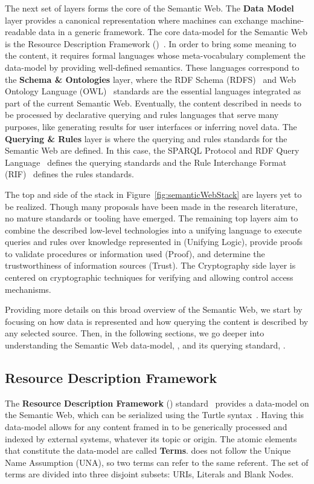 The next set of layers forms the core of the Semantic Web. The \textbf{Data Model} layer 
provides a canonical representation where machines can exchange machine-readable data in 
a generic framework. The core data-model for the Semantic Web is the Resource Description 
Framework (\RDF{})~\cite{key:rdfprimer}. In order to bring some meaning to the \RDF{} content, 
it requires formal languages whose meta-vocabulary complement the \RDF{} data-model by providing 
well-defined semantics. These languages correspond to the \textbf{Schema \& Ontologies} layer, 
where the RDF Schema (RDFS)~\cite{key:oldrdf} and Web Ontology Language (OWL)~\cite{key:owloverview, key:owl2rationale} 
standards are the essential languages integrated as part of the current Semantic Web. 
Eventually, the content described in \RDF{} needs to be processed by declarative querying 
and rules languages that serve many purposes, like generating results for user interfaces 
or inferring novel \RDF{} data. The \textbf{Querying \& Rules} layer is where the querying 
and rules standards for the Semantic Web are defined. In this case, the SPARQL Protocol 
and RDF Query Language~\cite{key:sparql,key:sparql11protocol,key:sparql11} 
defines the querying standards and the Rule Interchange Format (RIF)~\cite{key:rifframework} 
defines the rules standards.

The top and side of the stack in Figure~\ref{fig:semanticWebStack} are layers yet to be realized. Though many 
proposals have been made in the research literature, no mature standards or tooling have 
emerged. The remaining top layers aim to combine the described low-level technologies into 
a unifying language to execute queries and rules over knowledge represented in \RDF{} 
(Unifying Logic), provide proofs to validate procedures or information used (Proof), and 
determine the trustworthiness of information sources (Trust). The Cryptography side layer 
is centered on cryptographic techniques for verifying and allowing control access mechanisms.

Providing more details on this broad overview of the Semantic Web, we start by focusing on 
how data is represented and how querying the content is described by any selected source. 
Then, in the following sections, we go deeper into understanding the Semantic Web data-model, 
\RDF{}, and its querying standard, \SPARQL{}.

\subsection{Resource Description Framework}
\label{cap2:semWeb/rdf}
The \textbf{Resource Description Framework} (\RDF{}) standard~\cite{key:rdfprimer} provides 
a data-model on the Semantic Web, which can be serialized using the Turtle syntax~\cite{key:turtle}. 
Having this data-model allows for any content framed in \RDF{} to be generically processed 
and indexed by external systems, whatever its topic or origin. The atomic elements that 
constitute the \RDF{} data-model are called \textbf{\RDF{} Terms}. \RDF{} does not follow the Unique 
Name Assumption (UNA), so two \RDF{} terms can refer to the same referent. The set of \RDF{} terms 
are divided into three disjoint subsets: URIs, Literals and Blank Nodes.

